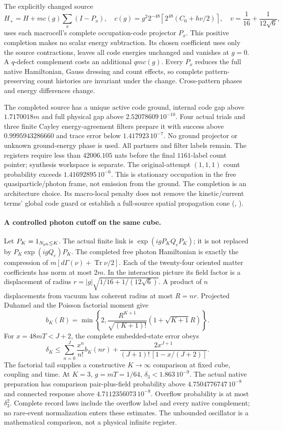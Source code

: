 The explicitly changed source
\[
 H_+=H+m c(g)\sum_x(I-P_x),\quad
 c(g)=g^2 2^{-48}\left\lceil2^{48}(C_0+hv/2)\right\rceil,\quad
 v=\frac1{16}+\frac1{12\sqrt6},
\]
uses each macrocell's complete occupation-code projector $P_x$.
This positive completion makes no scalar energy subtraction. Its chosen
coefficient uses only the source contractions, leaves all code energies
unchanged and vanishes at $g=0$. A $q$-defect complement costs an
additional $qmc(g)$. Every $P_x$ reduces the full native Hamiltonian,
Gauss dressing and count effects, so complete pattern-preserving count
histories are invariant under the change. Cross-pattern phases and
energy differences change.

The completed source has a unique active code ground, internal code gap
above $1.7170018m$ and full physical gap above $2.52078609\,10^{-10}$.
Four actual trials and three finite Cayley energy-agreement filters
prepare it with success above $0.9995943286660$ and trace error below
$1.417923\,10^{-7}$. No ground projector or unknown ground-energy phase
is used. All partners and filter labels remain. The registers require
less than $42006.105$ nats before the final $1161$-label count pointer;
synthesis workspace is separate. The original-attempt $(1,1,1)$ count
probability exceeds $1.41692895\,10^{-6}$. This is stationary occupation
in the free quasiparticle/photon frame, not emission from the ground.
The completion is an architecture choice. Its macro-local penalty does
not remove the kinetic/current terms' global code guard or establish a
full-source spatial propagation cone
(, \cite{ophrepo}).

\paragraph{A controlled photon cutoff on the same cube.}
Let $P_K=1_{N_{\rm ph}\le K}$. The actual finite link is
$\exp(igP_KQ_eP_K)$; it is not replaced by
$P_K\exp(igQ_e)P_K$. The completed free photon Hamiltonian is exactly
the compression of $m[d\Gamma(\nu)+\operatorname{Tr}\nu/2]$.
Each of the twenty-four oriented matter coefficients has norm at most
$2m$. In the interaction picture its field factor is a displacement
of radius $r=|g|\sqrt{1/16+1/(12\sqrt6)}$.
A product of $n$ displacements from vacuum has coherent radius at most
$R=nr$. Projected Duhamel and the Poisson factorial moment give
\[
 b_K(R)=\min\left\{2,\frac{R^{K+1}}{\sqrt{(K+1)!}}
                    (1+\sqrt{K+1}R)\right\}.
\]
For $x=48mT<J+2$, the complete embedded-state error obeys
\[
 \delta_K\le\sum_{n=0}^{J}\frac{x^n}{n!}b_K(nr)
 +\frac{2x^{J+1}}{(J+1)!\,[1-x/(J+2)]}.
\]
The factorial tail supplies a constructive $K\to\infty$ comparison
at fixed cube, coupling and time. At $K=3$, $g=mT=1/64$,
$\delta_3<1.863\,10^{-9}$. The actual native preparation has comparison
pair-plus-field probability above $4.7504776747\,10^{-8}$ and connected
response above $4.7112356073\,10^{-8}$. Overflow probability is at most
$\delta_3^2$. Complete record laws include the overflow label and every
native complement; no rare-event normalization enters these estimates.
The unbounded oscillator is a mathematical comparison, not a physical
infinite register.

